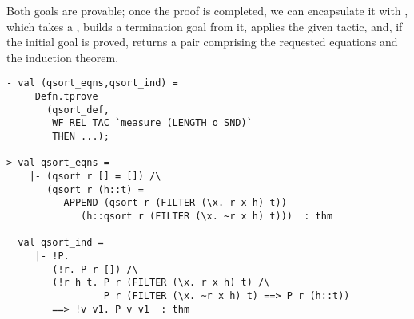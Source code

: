 Both goals are provable; once the proof is completed, we can
encapsulate it with , which takes a , builds
a termination goal from it, applies the given tactic, and, if the
initial goal is proved, returns a pair comprising the requested
equations and the induction theorem.

\begin{session}
\begin{verbatim}
- val (qsort_eqns,qsort_ind) =
     Defn.tprove
       (qsort_def,
        WF_REL_TAC `measure (LENGTH o SND)`
        THEN ...);

> val qsort_eqns =
    |- (qsort r [] = []) /\
       (qsort r (h::t) =
          APPEND (qsort r (FILTER (\x. r x h) t))
             (h::qsort r (FILTER (\x. ~r x h) t)))  : thm

  val qsort_ind =
     |- !P.
        (!r. P r []) /\
        (!r h t. P r (FILTER (\x. r x h) t) /\
                 P r (FILTER (\x. ~r x h) t) ==> P r (h::t))
        ==> !v v1. P v v1  : thm
\end{verbatim}
\end{session}

